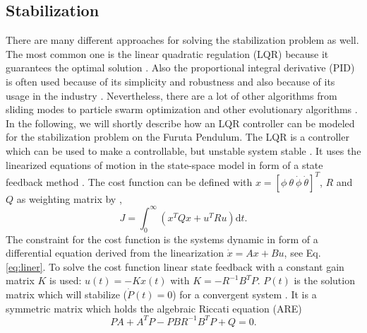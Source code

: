 \subsection{Stabilization}
There are many different approaches for solving the stabilization problem as 
well. The most common one is the linear quadratic regulation (LQR) because it 
guarantees the optimal solution \citep{hamza2019current}. Also the 
proportional integral derivative (PID) is often used because of its simplicity 
and robustness and also because of its usage in the industry 
\citep{hassanzadeh2011controller}. Nevertheless, there are a lot of other 
algorithms from sliding modes \citep{izutsu2008swing} to particle swarm 
optimization and other evolutionary algorithms 
\citep{hassanzadeh2011controller}.\\
In the following, we will shortly describe how an LQR controller can be modeled 
for the stabilization problem on the Furuta Pendulum. The LQR is a controller 
which can be used to make a controllable, but unstable system stable 
\citep{park2011swing}. It uses the linearized equations of motion in the 
state-space model in form of a state feedback method \citep{ozbek2010swing}. 
The cost function can be defined with $x=[\phi \ \theta \ \dot{\phi}\ 
\dot{\theta}]^T$, $R$ and $Q$ as weighting matrix by 
\citep{al2013experimental},
\[J=\int_{0}^{\infty}\left(x^TQx+u^TRu\right)\text{d}t.\]
The constraint for the cost function is the systems dynamic in form of a 
differential equation derived from the linearization $\dot{x}=Ax+Bu$, see 
Eq. \ref{eq:liner}. To solve 
the cost function linear state feedback with a constant gain matrix $K$ is 
used: $u(t)=-Kx(t)$ with $K=-R^{-1}B^TP$. $P(t)$ is the 
solution matrix which will stabilize ($\dot{P}(t)=0$) for a convergent system 
\citep{chen2007linear}. It 
is a symmetric matrix which holds the algebraic Riccati equation (ARE) 
\citep{al2013experimental}
\[PA+A^TP-PBR^{-1}B^TP+Q=0.\]

